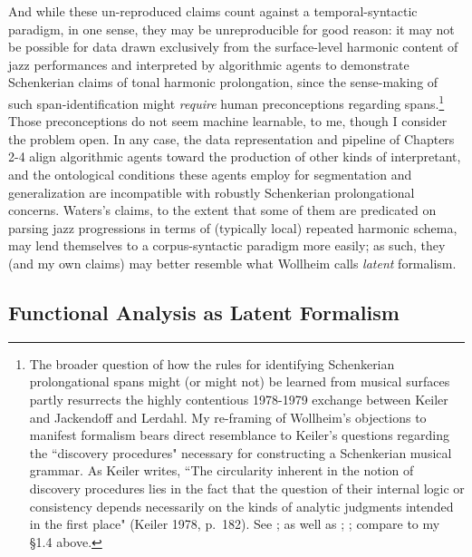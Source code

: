 And while these un-reproduced claims count against a temporal-syntactic paradigm, in one sense, they may be unreproducible for good reason: it may not be possible for data drawn exclusively from the surface-level harmonic content of jazz performances and interpreted by algorithmic agents to demonstrate Schenkerian claims of tonal harmonic prolongation, since the sense-making of such span-identification might \emph{require} human preconceptions regarding spans.\footnote{The broader question of how the rules for identifying Schenkerian prolongational spans might (or might not) be learned from musical surfaces partly resurrects the highly contentious 1978-1979 exchange between Keiler and Jackendoff and Lerdahl.  My re-framing of Wollheim's objections to manifest formalism bears direct resemblance to Keiler's questions regarding the ``discovery procedures" necessary for constructing a Schenkerian musical grammar. As Keiler writes, ``The circularity inherent in the notion of discovery procedures lies in the fact that the question of their internal logic or consistency depends necessarily on the kinds of analytic judgments intended in the first place" (Keiler 1978, p.\ 182).  See \cite{keiler1978}; as well as \cite{jackendoff1979}; \cite{keiler1979}; compare to my \S 1.4 above.}  Those preconceptions do not seem machine learnable, to me, though I consider the problem open.  In any case, the data representation and pipeline of Chapters 2-4 align algorithmic agents toward the production of other kinds of interpretant, and the ontological conditions these agents employ for segmentation and generalization are incompatible with robustly Schenkerian prolongational concerns.  Waters's claims, to the extent that some of them are predicated on parsing jazz progressions in terms of (typically local) repeated harmonic schema, may lend themselves to a corpus-syntactic paradigm more easily; as such, they (and my own claims) may better resemble what Wollheim calls \emph{latent} formalism.

\subsection{Functional Analysis as Latent Formalism}


